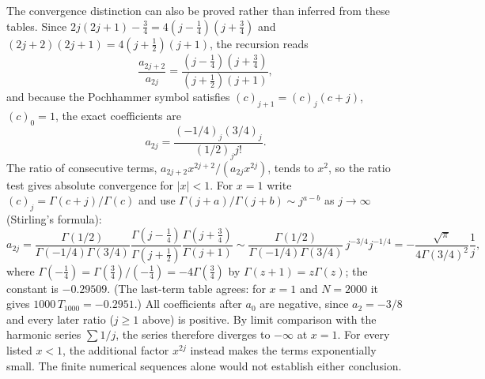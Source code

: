 The convergence distinction can also be proved rather than inferred
from these tables. Since $2j(2j+1)-\frac34=4(j-\frac14)(j+\frac34)$ and
$(2j+2)(2j+1)=4(j+\frac12)(j+1)$, the recursion reads
\[
\frac{a_{2j+2}}{a_{2j}}=\frac{(j-\frac14)(j+\frac34)}{(j+\frac12)(j+1)},
\]
and because the Pochhammer symbol satisfies $(c)_{j+1}=(c)_j(c+j)$,
$(c)_0=1$, the exact coefficients are
\[
a_{2j}=\frac{(-1/4)_j(3/4)_j}{(1/2)_j j!}.
\]
The ratio of consecutive terms, $a_{2j+2}x^{2j+2}/(a_{2j}x^{2j})$,
tends to $x^2$, so the ratio test gives absolute convergence for
$|x|<1$. For $x=1$ write $(c)_j=\Gamma(c+j)/\Gamma(c)$ and use
$\Gamma(j+a)/\Gamma(j+b)\sim j^{a-b}$ as $j\to\infty$ (Stirling's formula):
\[
a_{2j}=\frac{\Gamma(1/2)}{\Gamma(-1/4)\Gamma(3/4)}
\frac{\Gamma(j-\frac14)}{\Gamma(j+\frac12)}
\frac{\Gamma(j+\frac34)}{\Gamma(j+1)}
\sim \frac{\Gamma(1/2)}{\Gamma(-1/4)\Gamma(3/4)}\,j^{-3/4}j^{-1/4}
=-\frac{\sqrt\pi}{4\Gamma(3/4)^2}\frac1j,
\]
where $\Gamma(-\frac14)=\Gamma(\frac34)/(-\frac14)=-4\Gamma(\frac34)$
by $\Gamma(z+1)=z\Gamma(z)$; the constant is $-0.29509$. (The last-term
table agrees: for $x=1$ and $N=2000$ it gives $1000\,T_{1000}=-0.2951$.)
All coefficients after $a_0$ are negative, since $a_2=-3/8$ and every
later ratio ($j\ge1$ above) is positive. By limit comparison with the
harmonic series $\sum1/j$, the series therefore diverges to $-\infty$
at $x=1$.
For every listed $x<1$, the additional factor $x^{2j}$ instead makes
the terms exponentially small. The finite numerical sequences alone
would not establish either conclusion.

